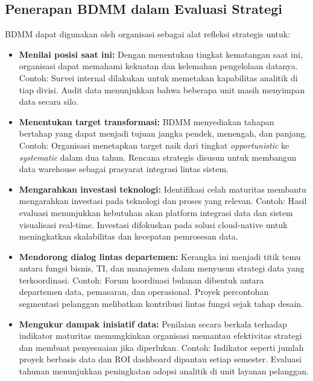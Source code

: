 \subsection{Penerapan BDMM dalam Evaluasi Strategi}

BDMM dapat digunakan oleh organisasi sebagai alat refleksi strategis untuk:

\begin{itemize}
	\item \textbf{Menilai posisi saat ini:} Dengan menentukan tingkat kematangan saat ini, organisasi dapat memahami kekuatan dan kelemahan pengelolaan datanya. Contoh: Survei internal dilakukan untuk memetakan kapabilitas analitik di tiap divisi. Audit data menunjukkan bahwa beberapa unit masih menyimpan data secara silo.
	
	\item \textbf{Menentukan target transformasi:} BDMM menyediakan tahapan bertahap yang dapat menjadi tujuan jangka pendek, menengah, dan panjang. Contoh: Organisasi menetapkan target naik dari tingkat \textit{opportunistic} ke \textit{systematic} dalam dua tahun. Rencana strategis disusun untuk membangun data warehouse sebagai prasyarat integrasi lintas sistem.
	
	\item \textbf{Mengarahkan investasi teknologi:} Identifikasi celah maturitas membantu mengarahkan investasi pada teknologi dan proses yang relevan. Contoh: Hasil evaluasi menunjukkan kebutuhan akan platform integrasi data dan sistem visualisasi real-time. Investasi difokuskan pada solusi cloud-native untuk meningkatkan skalabilitas dan kecepatan pemrosesan data.
	
	\item \textbf{Mendorong dialog lintas departemen:} Kerangka ini menjadi titik temu antara fungsi bisnis, TI, dan manajemen dalam menyusun strategi data yang terkoordinasi. Contoh: Forum koordinasi bulanan dibentuk antara departemen data, pemasaran, dan operasional. Proyek percontohan segmentasi pelanggan melibatkan kontribusi lintas fungsi sejak tahap desain.
	
	\item \textbf{Mengukur dampak inisiatif data:} Penilaian secara berkala terhadap indikator maturitas memungkinkan organisasi memantau efektivitas strategi dan membuat penyesuaian jika diperlukan. Contoh: Indikator seperti jumlah proyek berbasis data dan ROI dashboard dipantau setiap semester. Evaluasi tahunan menunjukkan peningkatan adopsi analitik di unit layanan pelanggan.
\end{itemize}


